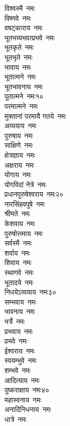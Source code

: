 \begin{multicols}{\maxColumns}
\begin{flushleft}
विश्वस्मै~नमः\\
विष्णवे~नमः\\
वषट्काराय~नमः\\
भूतभव्यभवत्प्रभवे~नमः\\
भूतकृते~नमः\\
भूतभृते~नमः\\
भावाय~नमः\\
भूतात्मने~नमः\\
भूतभावनाय~नमः\\
पूतात्मने~नमः\hfill १०\\
परमात्मने~नमः\\
मुक्तानां परमायै गतये~नमः\\
अव्ययाय~नमः\\
पुरुषाय~नमः\\
साक्षिणे~नमः\\
क्षेत्रज्ञाय~नमः\\
अक्षराय~नमः\\
योगाय~नमः\\
योगविदां नेत्रे~नमः\\
प्रधानपुरुषेश्वराय~नमः\hfill २०\\
नारसिंहवपुषे~नमः\\
श्रीमते~नमः\\
केशवाय~नमः\\
पुरुषोत्तमाय~नमः\\
सर्वस्मै~नमः\\
शर्वाय~नमः\\
शिवाय~नमः\\
स्थाणवे~नमः\\
भूतादये~नमः\\
निधयेऽव्ययाय~नमः\hfill ३०\\
सम्भवाय~नमः\\
भावनाय~नमः\\
भर्त्रे~नमः\\
प्रभवाय~नमः\\
प्रभवे~नमः\\
ईश्वराय~नमः\\
स्वयम्भुवे~नमः\\
शम्भवे~नमः\\
आदित्याय~नमः\\
पुष्कराक्षाय~नमः\hfill ४०\\
महास्वनाय~नमः\\
अनादिनिधनाय~नमः\\
धात्रे~नमः\\

\end{flushleft}
\end{multicols}
